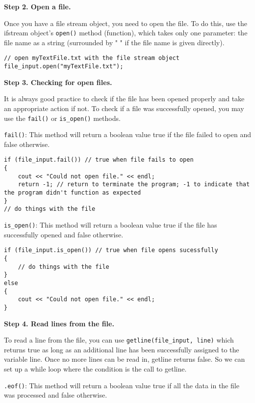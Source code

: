 \textbf{Step 2. Open a file.}

Once you have a file stream object, you need to open the file. To do this, use the ifstream object's \texttt{open()} method (function), which takes only one parameter: the file name as a string (surrounded by " " if the file name is given directly).

\begin{verbatim}
// open myTextFile.txt with the file stream object
file_input.open("myTextFile.txt");
\end{verbatim}
  
\textbf{Step 3. Checking for open files.}

It is always good practice to check if the file has been opened properly and take an appropriate action if not. To check if a file was successfully opened, you may use the \texttt{fail()} or \texttt{is_open()} methods.

\texttt{fail()}: This method will return a boolean value true if the file failed to open and false otherwise.

\begin{verbatim}
if (file_input.fail()) // true when file fails to open
{
    cout << "Could not open file." << endl; 
    return -1; // return to terminate the program; -1 to indicate that the program didn't function as expected
}
// do things with the file
\end{verbatim}

\texttt{is_open()}: This method will return a boolean value true if the file has successfully opened and false otherwise.

\begin{verbatim}
if (file_input.is_open()) // true when file opens sucessfully
{
    // do things with the file
}
else
{
    cout << "Could not open file." << endl;        
}
\end{verbatim}

\textbf{Step 4. Read lines from the file.}

To read a line from the file, you can use \texttt{getline(file_input, line)} which returns true as long as an additional line has been successfully assigned to the variable line. Once no more lines can be read in, getline returns false. So we can set up a while loop where the condition is the call to getline. 

\texttt{.eof()}: This method will return a boolean value true if all the data in the file was processed and false otherwise.

